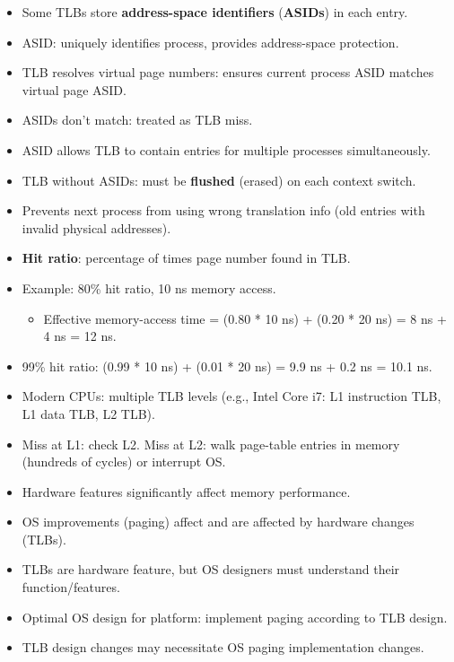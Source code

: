 \begin{itemize}
    \item Some TLBs store \textbf{address-space identifiers} (\textbf{ASIDs}) in each entry.
    \item ASID: uniquely identifies process, provides address-space protection.
    \item TLB resolves virtual page numbers: ensures current process ASID matches virtual page ASID.
    \item ASIDs don't match: treated as TLB miss.
    \item ASID allows TLB to contain entries for multiple processes simultaneously.
    \item TLB without ASIDs: must be \textbf{flushed} (erased) on each context switch.
    \item Prevents next process from using wrong translation info (old entries with invalid physical addresses).
    \item \textbf{Hit ratio}: percentage of times page number found in TLB.
    \item Example: 80\% hit ratio, 10 ns memory access.
    \begin{itemize}
        \item Effective memory-access time = (0.80 * 10 ns) + (0.20 * 20 ns) = 8 ns + 4 ns = 12 ns.
    \end{itemize}
    \item 99\% hit ratio: (0.99 * 10 ns) + (0.01 * 20 ns) = 9.9 ns + 0.2 ns = 10.1 ns.
    \item Modern CPUs: multiple TLB levels (e.g., Intel Core i7: L1 instruction TLB, L1 data TLB, L2 TLB).
    \item Miss at L1: check L2. Miss at L2: walk page-table entries in memory (hundreds of cycles) or interrupt OS.
    \item Hardware features significantly affect memory performance.
    \item OS improvements (paging) affect and are affected by hardware changes (TLBs).
    \item TLBs are hardware feature, but OS designers must understand their function/features.
    \item Optimal OS design for platform: implement paging according to TLB design.
    \item TLB design changes may necessitate OS paging implementation changes.
\end{itemize}

